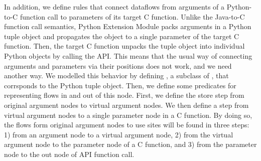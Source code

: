 In addition, we define rules that connect dataflows from arguments of
a Python-to-C function call to parameters of its target C function.
Unlike the Java-to-C function call semantics, Python Extension Module
packs arguments in a Python tuple object and propagates the object to a single
parameter of the target C function. 
Then, the target C function unpacks the tuple object into individual Python
objects by calling the  API. 
This means that the usual way of connecting arguments and parameters via their
positions does not work, and we need another way.
We modelled this behavior by defining , a subclass of ,
that corrsponds to the Python tuple object. Then, we define some predicates
for representing flows in and out of this node. First, we define the store step
from original argument nodes to virtual argument nodes. We then define
a step from virtual argument nodes to a single parameter node in a C function.
By doing so, the flows form original argument nodes to use sites will be
found in three steps: 1) from an argument node to a virtual argument node,
2) from the virtual argument node to the parameter node of a C function,
and 3) from the parameter node to the out node of  API function call.



\medskip

